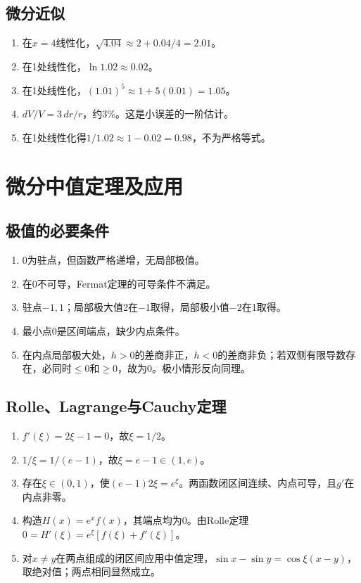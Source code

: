 \documentclass[11pt,a4paper,fontset=fandol]{ctexrep}
\begin{document}
\subsection{微分近似}
\begin{enumerate}
\item 在$x=4$线性化，$\sqrt{4.04}\approx2+0.04/4=2.01$。
\item 在1处线性化，$\ln1.02\approx0.02$。
\item 在1处线性化，$(1.01)^5\approx1+5(0.01)=1.05$。
\item $dV/V=3\,dr/r$，约3\%。这是小误差的一阶估计。
\item 在1处线性化得$1/1.02\approx1-0.02=0.98$，不为严格等式。
\end{enumerate}
\section{微分中值定理及应用}
\subsection{极值的必要条件}
\begin{enumerate}
\item 0为驻点，但函数严格递增，无局部极值。
\item 在0不可导，Fermat定理的可导条件不满足。
\item 驻点$-1,1$；局部极大值2在$-1$取得，局部极小值$-2$在1取得。
\item 最小点0是区间端点，缺少内点条件。
\item 在内点局部极大处，$h>0$的差商非正，$h<0$的差商非负；若双侧有限导数存在，必同时$\le0$和$\ge0$，故为0。极小情形反向同理。
\end{enumerate}
\subsection{Rolle、Lagrange与Cauchy定理}
\begin{enumerate}
\item $f'(\xi)=2\xi-1=0$，故$\xi=1/2$。
\item $1/\xi=1/(e-1)$，故$\xi=e-1\in(1,e)$。
\item 存在$\xi\in(0,1)$，使$(e-1)2\xi=e^\xi$。两函数闭区间连续、内点可导，且$g'$在内点非零。
\item 构造$H(x)=e^x f(x)$，其端点均为0。由Rolle定理$0=H'(\xi)=e^\xi[f(\xi)+f'(\xi)]$。
\item 对$x\ne y$在两点组成的闭区间应用中值定理，$\sin x-\sin y=\cos\xi(x-y)$，取绝对值；两点相同显然成立。
\end{enumerate}
\end{document}
